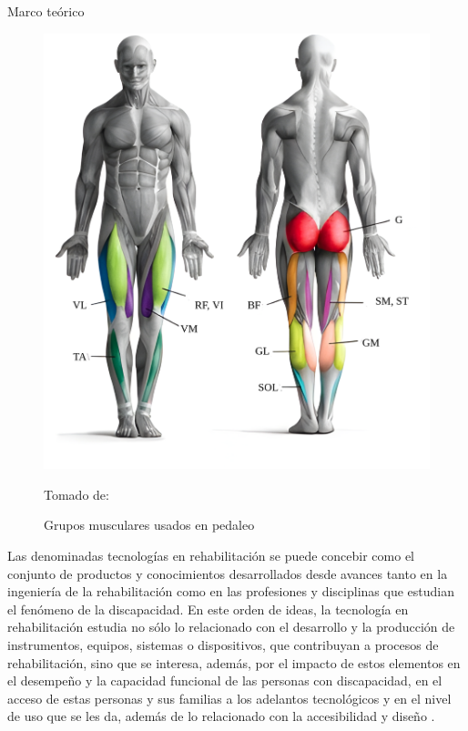 \begin{thesischapter}{1} {Marco teórico}
    \begin{figure}[ht]
        \centering
        \includegraphics[scale=0.2]{images/musculegroups.png}
        \caption{Grupos musculares usados en pedaleo}
        Tomado de: ~\cite{Quémúsc72}
        \label{fig: musculegroups}
    \end{figure}

    \vspace{10pt}
    Las denominadas tecnologías en rehabilitación se puede concebir como el conjunto de productos y conocimientos desarrollados desde avances tanto en la ingeniería de la rehabilitación como en las profesiones y disciplinas que estudian el fenómeno de la discapacidad. En este orden de ideas, la tecnología en rehabilitación estudia no sólo lo relacionado con el desarrollo y la producción de instrumentos, equipos, sistemas o dispositivos, que contribuyan a procesos de rehabilitación, sino que se interesa, además, por el impacto de estos elementos en el desempeño y la capacidad funcional de las personas con discapacidad, en el acceso de estas personas y sus familias a los adelantos tecnológicos y en el nivel de uso que se les da, además de lo relacionado con la accesibilidad y diseño \cite{matheus1990tecnologia}.


\end{thesischapter}
